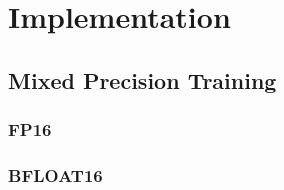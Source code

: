\section{Implementation}

\subsection{Mixed Precision Training}

\subsubsection{FP16}



\subsubsection{BFLOAT16}